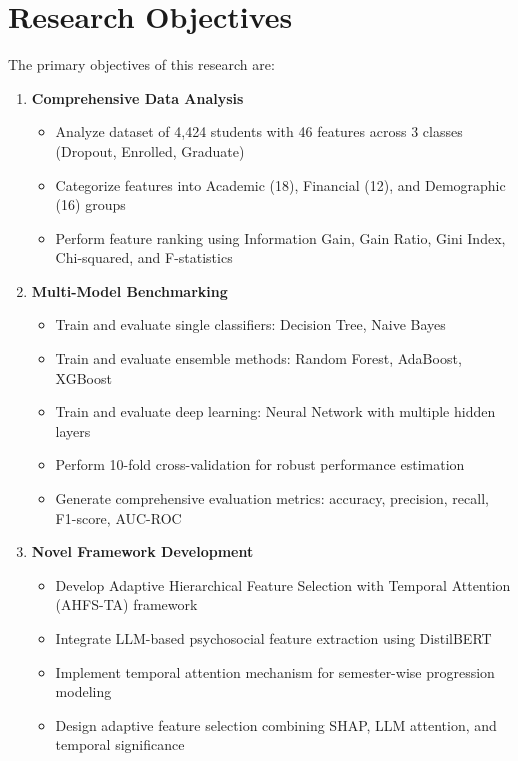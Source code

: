 \section{Research Objectives}

The primary objectives of this research are:

\begin{enumerate}
    \item \textbf{Comprehensive Data Analysis}
    \begin{itemize}
        \item Analyze dataset of 4,424 students with 46 features across 3 classes (Dropout, Enrolled, Graduate)
        \item Categorize features into Academic (18), Financial (12), and Demographic (16) groups
        \item Perform feature ranking using Information Gain, Gain Ratio, Gini Index, Chi-squared, and F-statistics
    \end{itemize}
    
    \item \textbf{Multi-Model Benchmarking}
    \begin{itemize}
        \item Train and evaluate single classifiers: Decision Tree, Naive Bayes
        \item Train and evaluate ensemble methods: Random Forest, AdaBoost, XGBoost
        \item Train and evaluate deep learning: Neural Network with multiple hidden layers
        \item Perform 10-fold cross-validation for robust performance estimation
        \item Generate comprehensive evaluation metrics: accuracy, precision, recall, F1-score, AUC-ROC
    \end{itemize}
    
    \item \textbf{Novel Framework Development}
    \begin{itemize}
        \item Develop Adaptive Hierarchical Feature Selection with Temporal Attention (AHFS-TA) framework
        \item Integrate LLM-based psychosocial feature extraction using DistilBERT
        \item Implement temporal attention mechanism for semester-wise progression modeling
        \item Design adaptive feature selection combining SHAP, LLM attention, and temporal significance
    \end{itemize}
    

\end{enumerate}
